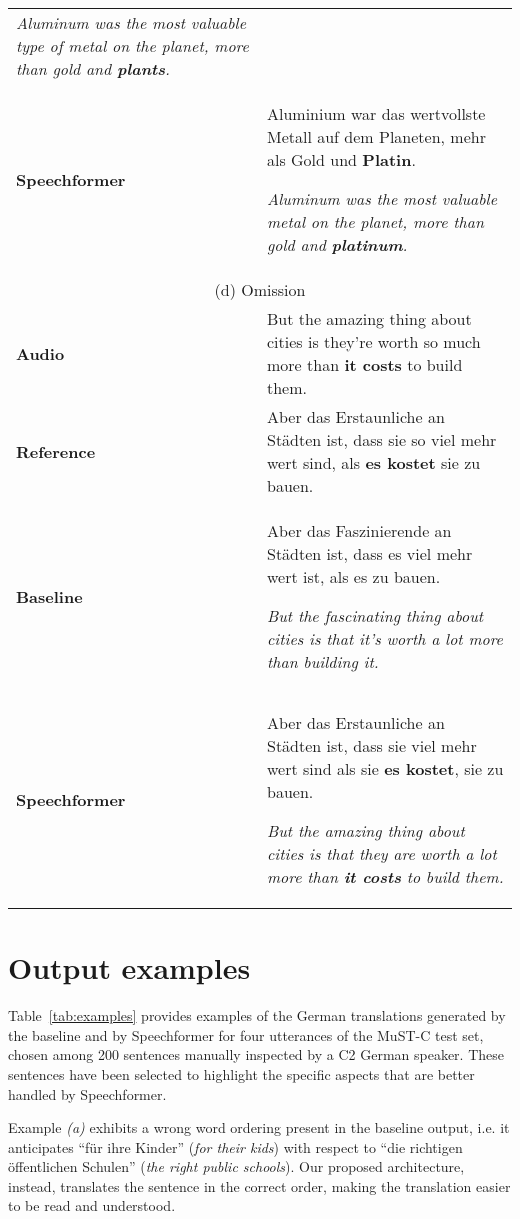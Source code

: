 \documentclass[11pt]{article}
\begin{document}
{\begin{table*}[h!]
\begin{tabular}{p{2cm}|p{13cm}}
      \textit{Aluminum was the most valuable type of metal on the planet, more than gold and \textbf{plants}.}
      \\
      \textbf{Speechformer} & Aluminium war das wertvollste Metall auf dem Planeten, mehr als Gold und \textbf{Platin}.
      
      \textit{
Aluminum was the most valuable metal on the planet, more than gold and \textbf{platinum}.}
      \\
      \hline
      \multicolumn{2}{c}{(d) Omission} \\
      \hline
      \textbf{Audio} & But the amazing thing about cities is they're worth so much more than \textbf{it costs} to build them. \\
      \textbf{Reference} & Aber das Erstaunliche an Städten ist, dass sie so viel mehr wert sind, als \textbf{es kostet} sie zu bauen. \\
      \textbf{Baseline} & Aber das Faszinierende an Städten ist, dass es viel mehr wert ist, als es zu bauen. 
      
      \textit{But the fascinating thing about cities is that it's worth a lot more than building it.}
      \\
      \textbf{Speechformer} & Aber das Erstaunliche an Städten ist, dass sie viel mehr wert sind als sie \textbf{es kostet}, sie zu bauen.
      
      \textit{
But the amazing thing about cities is that they are worth a lot more than \textbf{it costs} to build them.}
      \\
      \hline
  \end{tabular} 
  \caption{\label{tab:examples} Examples of translation problems -- \textit{(a)}, \textit{(b)}, \textit{(c)} -- and omissions -- \textit{(d)} -- that Speechformer does not suffer from while baseline does.}
\end{table*}
}


\section{Output examples}

Table~\ref{tab:examples} provides examples of the German translations generated by the baseline and by Speechformer for four utterances of the MuST-C test set, chosen among 200 sentences manually inspected by a C2 German speaker. These sentences have been selected to highlight the specific aspects that are better handled by Speechformer.

Example \emph{(a)} exhibits a wrong word ordering present in the baseline output, i.e. it anticipates ``für ihre Kinder'' (\textit{for their kids}) with respect to ``die richtigen öffentlichen Schulen'' (\textit{the right public schools}). 
Our proposed architecture, instead, translates the sentence in the correct order, making the translation easier to be read and understood.
\end{document}
